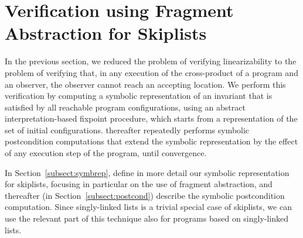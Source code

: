 \section{Verification using Fragment Abstraction for Skiplists}
\label{sec:fragment-abstraction}
In the previous section, we reduced the problem of verifying linearizability
to the problem of verifying
that, in any execution of the cross-product of a program and an observer, 
the observer cannot reach an accepting location.
We perform this verification by  computing a symbolic representation
of an invariant that is satisfied by all reachable program configurations,
using an abstract interpretation-based fixpoint procedure, which starts
from a representation of the set of initial configurations.
thereafter repeatedly performs
symbolic postcondition computations that extend the
symbolic representation by the effect of any execution step of the program,
until convergence.

In Section~\ref{subsect:symbrep},
define in more detail our symbolic representation for skiplists,
focusing in particular on the use of fragment abstraction, and thereafter
(in Section~\ref{subsect:postcond})
describe the symbolic postcondition computation.
Since singly-linked lists is a trivial special case of skiplists, we can use
the relevant part of this technique also for programs based on singly-linked
lists.




